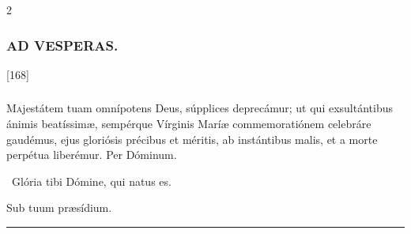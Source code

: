 \documentclass[9pt,twoside]{extarticle}
\begin{document}
\begin{multicols}{2}
{{\subsubsection*{\center \textsc{AD VESPERAS.}}
\begin{tightlist}{}
\item {} [168] 
\end{tightlist}


\subsubsection*{\center {}}
\lettrine{M}ajestátem tuam omnípotens Deus, súpplices deprecámur; ut qui exsultántibus ánimis beatíssimæ, sempérque Vírginis Maríæ commemoratiónem celebráre gaudémus, ejus gloriósis précibus et méritis, ab instántibus malis, et a morte perpétua liberémur. Per Dóminum.

\begin{tightlist}{}
\item {}~Glória tibi Dómine, qui natus es.
\item {} Sub tuum præsídium.
\end{tightlist}

\begin{center}\textcolor{red}{\rule{\linewidth}{0.5pt}} \end{center}

}}
\end{multicols}
\end{document}
